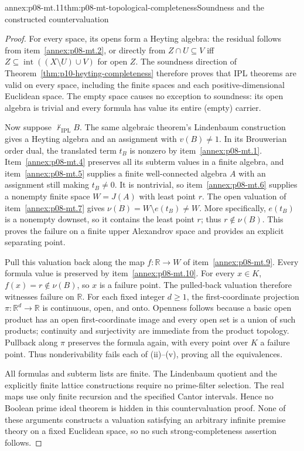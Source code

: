 \begin{annexitem}{annex:p08-mt.11}{thm:p08-mt-topological-completeness}{Soundness and the constructed countervaluation}
\begin{proof}
For every space, its opens form a Heyting algebra: the residual follows
from item~\ref{annex:p08-mt.2}, or directly from
\(Z\cap U\subseteq V\) iff
\(Z\subseteq\operatorname{int}((X\setminus U)\cup V)\) for open
\(Z\). The soundness direction of
Theorem~\ref{thm:p10-heyting-completeness} therefore proves that IPL
theorems are valid on every space, including the finite spaces and
each positive-dimensional Euclidean space. The empty space causes no
exception to soundness: its open algebra is trivial and every formula
has value its entire (empty) carrier.

Now suppose \(\nvdash_{\mathrm{IPL}}B\). The same algebraic theorem's
Lindenbaum construction gives a Heyting algebra and an assignment with
\(v(B)\ne1\). In its Brouwerian order dual, the translated term
\(t_B\) is nonzero by item~\ref{annex:p08-mt.1}.
Item~\ref{annex:p08-mt.4} preserves all its subterm values in a finite
algebra, and item~\ref{annex:p08-mt.5} supplies a finite well-connected
algebra \(A\) with an assignment still making \(t_B\ne0\).
It is nontrivial, so item~\ref{annex:p08-mt.6} supplies a nonempty
finite space \(W=J(A)\) with least point \(r\).
The open valuation of item~\ref{annex:p08-mt.7} gives
\(\nu(B)=W\setminus e(t_B)\ne W\). More specifically,
\(e(t_B)\) is a nonempty downset, so it contains the least point
\(r\); thus \(r\notin\nu(B)\). This proves the failure on a finite
upper Alexandrov space and provides an explicit separating point.

Pull this valuation back along the map
\(f:\mathbb R\to W\) of item~\ref{annex:p08-mt.9}. Every formula
value is preserved by item~\ref{annex:p08-mt.10}. For every \(x\in K\),
\(f(x)=r\notin\nu(B)\), so \(x\) is a failure point. The pulled-back
valuation therefore witnesses failure on \(\mathbb R\).
For each fixed integer \(d\geq1\), the first-coordinate projection
\(\pi:\mathbb R^d\to\mathbb R\) is continuous, open, and onto.
Openness follows because a basic open product has an open first-coordinate
image and every open set is a union of such products; continuity and
surjectivity are immediate from the product topology. Pullback along
\(\pi\) preserves the formula again, with every point over \(K\) a
failure point. Thus nonderivability fails each of (ii)--(v), proving
all the equivalences.

All formulas and subterm lists are finite. The Lindenbaum quotient and
the explicitly finite lattice constructions require no prime-filter
selection. The real maps use only finite recursion and the specified
Cantor intervals. Hence no Boolean prime ideal theorem is hidden in
this countervaluation proof. None of these arguments constructs a
valuation satisfying an arbitrary infinite premise theory on a fixed
Euclidean space, so no such strong-completeness assertion follows.
\end{proof}
\end{annexitem}

